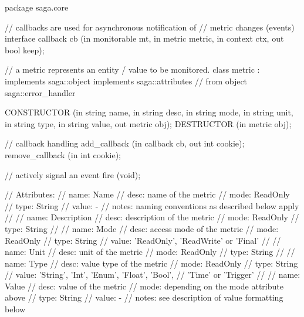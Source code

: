  \begin{myspec}
  package saga.core
  {
    // callbacks are used for asynchronous notification of
    // metric changes (events)
    interface callback
    {
      cb               (in  monitorable     mt,
                        in  metric          metric,
                        in  context         ctx,
                        out bool            keep);
    }
 
 
    // a metric represents an entity / value to be monitored.
    class metric : implements   saga::object
                   implements   saga::attributes
                // from object  saga::error_handler
    {
      CONSTRUCTOR        (in  string          name,
                          in  string          desc,
                          in  string          mode,
                          in  string          unit,
                          in  string          type,
                          in  string          value,
                          out metric          obj);
      DESTRUCTOR         (in  metric          obj);
 
      // callback handling
      add_callback       (in  callback        cb,
                          out int             cookie);
      remove_callback    (in  int             cookie);
 
      // actively signal an event
      fire               (void);
 
 
      // Attributes:
      //   name:  Name
      //   desc:  name of the metric
      //   mode:  ReadOnly
      //   type:  String
      //   value: -
      //   notes: naming conventions as described below apply
      //
      //   name:  Description
      //   desc:  description of the metric
      //   mode:  ReadOnly
      //   type:  String
      //
      //   name:  Mode
      //   desc:  access mode of the metric
      //   mode:  ReadOnly
      //   type:  String
      //   value: 'ReadOnly', 'ReadWrite' or 'Final'
      //
      //   name:  Unit
      //   desc:  unit of the metric
      //   mode:  ReadOnly
      //   type:  String
      //
      //   name:  Type
      //   desc:  value type of the metric
      //   mode:  ReadOnly
      //   type:  String
      //   value: 'String', 'Int', 'Enum', 'Float', 'Bool', 
      //          'Time' or 'Trigger'
      //
      //   name:  Value
      //   desc:  value of the metric
      //   mode:  depending on the mode attribute above
      //   type:  String
      //   value: -
      //   notes: see description of value formatting below
    }
 
}
\end{myspec}
